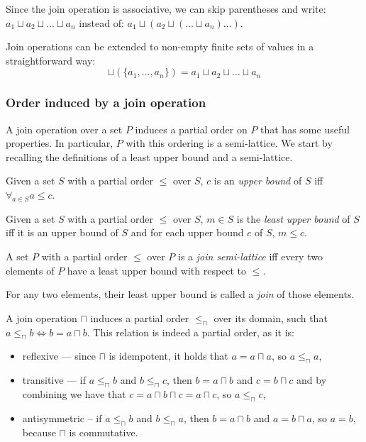 Since the join operation is associative, we can skip parentheses and write: $ a_1 \sqcup a_2 \sqcup \dots \sqcup a_n$ instead of: $ a_1 \sqcup (a_2 \sqcup ( \dots \sqcup a_n) \dots )$.

Join operations can be extended to non-empty finite sets of values in a straightforward way:
$$\sqcup(\{a_1, \dots, a_n \}) = a_1 \sqcup a_2 \sqcup \dots \sqcup a_n$$

\subsubsection{Order induced by a join operation}

A join operation over a set $P$ induces a partial order on $P$ that has some useful properties. In particular, $P$ with this ordering is a semi-lattice. We start by recalling the definitions of a least upper bound and a semi-lattice.

\begin{defn}
Given a set $S$ with a partial order $\le$ over $S$, $c$ is an \emph{upper bound} of $S$ iff $\forall_{a \in S} a \le c$.
\end{defn}

\begin{defn}
Given a set $S$ with a partial order $\le$ over $S$, $m \in S$ is the \emph{least upper bound} of $S$ iff it is an upper bound of $S$ and for each upper bound $c$ of $S$, $m \le c$.
\end{defn}

\begin{defn}
A set $P$ with a partial order $\le$ over $P$ is a \emph{join semi-lattice} iff every two elements of $P$ have a least upper bound with respect to $\le$.
\end{defn}

For any two elements, their least upper bound is called a \emph{join} of those elements.

A join operation $\sqcap$ induces a partial order $\le_\sqcap$ over its domain, such that $a \le_\sqcap b \iff b = a \sqcap b$. This relation is indeed a partial order, as it is:
\begin{itemize}
\item reflexive --- since $\sqcap$ is idempotent, it holds that $a = a \sqcap a$, so  $a \le_\sqcap a$,
\item transitive --- if $a \le_\sqcap b$ and $b \le_\sqcap c$, then $b = a \sqcap b$ and $c = b \sqcap c$ and by combining we have that $c = a \sqcap b \sqcap c = a \sqcap c$, so $a \le_\sqcap c$,
\item antisymmetric -- if $a \le_\sqcap b$ and $b \le_\sqcap a$, then $b = a \sqcap b$ and $a = b \sqcap a$, so $a = b$, because $\sqcap$ is commutative.
\end{itemize}

